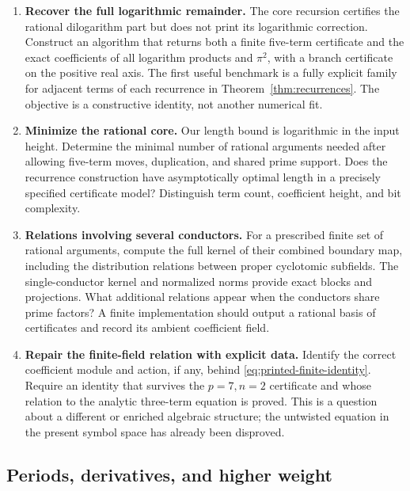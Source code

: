 \documentclass[11pt]{article}
\numberwithin{equation}{section}
\theoremstyle{definition}
\theoremstyle{remark}
\begin{document}
\begin{enumerate}
\item \textbf{Recover the full logarithmic remainder.}
      The core recursion certifies the rational dilogarithm part
      but does not print its logarithmic correction. Construct an
      algorithm that returns both a finite five-term certificate
      and the exact coefficients of all logarithm products and
      $\pi^2$, with a branch certificate on the positive real
      axis. The first useful benchmark is a fully explicit family
      for adjacent terms of each recurrence in
      Theorem~\ref{thm:recurrences}. The objective is a constructive
      identity, not another numerical fit.

\item \textbf{Minimize the rational core.}
      Our length bound is logarithmic in the input height.
      Determine the minimal number of rational arguments needed
      after allowing five-term moves, duplication, and shared
      prime support. Does the recurrence construction have
      asymptotically optimal length in a precisely specified
      certificate model? Distinguish term count, coefficient
      height, and bit complexity.

\item \textbf{Relations involving several conductors.}
      For a prescribed finite set of rational arguments, compute
      the full kernel of their combined boundary map, including
      the distribution relations between proper cyclotomic
      subfields. The single-conductor kernel and normalized norms
      provide exact blocks and projections. What additional
      relations appear when the conductors share prime factors?
      A finite implementation should output a rational basis of
      certificates and record its ambient coefficient field.

\item \textbf{Repair the finite-field relation with explicit data.}
      Identify the correct coefficient module and action, if any,
      behind \eqref{eq:printed-finite-identity}. Require an identity
      that survives the $p=7,n=2$ certificate and whose relation
      to the analytic three-term equation is proved. This is a
      question about a different or enriched algebraic structure;
      the untwisted equation in the present symbol space has
      already been disproved.
\end{enumerate}

\subsection{Periods, derivatives, and higher weight}
\end{document}
